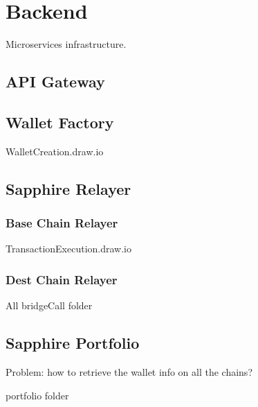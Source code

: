 \section{Backend}
\label{sec:backend}

Microservices infrastructure.

\subsection{API Gateway}
\label{subsec:api_gateway}

\subsection{Wallet Factory}
\label{subsec:wallet_factory}

WalletCreation.draw.io

\subsection{Sapphire Relayer}
\label{subsec:sapphire_relayer}

\subsubsection{Base Chain Relayer}
\label{subsubsec:base_chain_relayer}

TransactionExecution.draw.io

\subsubsection{Dest Chain Relayer}
\label{subsubsec:dest_chain_relayer}

All bridgeCall folder

\subsection{Sapphire Portfolio}
\label{subsec:sapphire_portfolio}

Problem: how to retrieve the wallet info on all the chains?

portfolio folder
